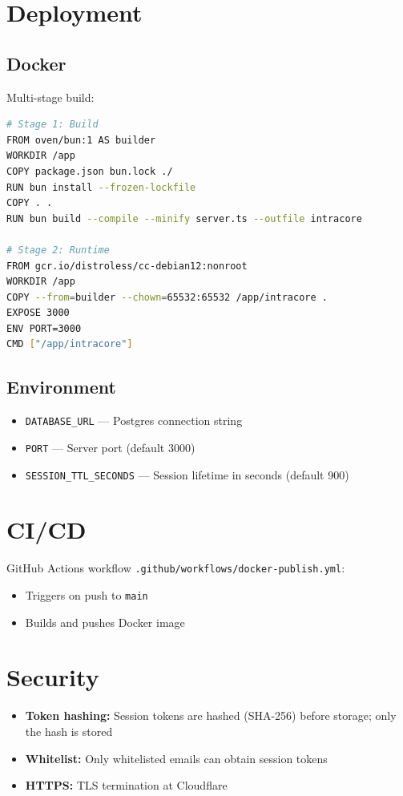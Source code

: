 \documentclass{article}
\begin{document}
\clearpage
\section{Deployment}

\subsection{Docker}
Multi-stage build:

\begin{lstlisting}[language=bash]
# Stage 1: Build
FROM oven/bun:1 AS builder
WORKDIR /app
COPY package.json bun.lock ./
RUN bun install --frozen-lockfile
COPY . .
RUN bun build --compile --minify server.ts --outfile intracore

# Stage 2: Runtime
FROM gcr.io/distroless/cc-debian12:nonroot
WORKDIR /app
COPY --from=builder --chown=65532:65532 /app/intracore .
EXPOSE 3000
ENV PORT=3000
CMD ["/app/intracore"]
\end{lstlisting}

\subsection{Environment}
\begin{itemize}[noitemsep]
  \item \texttt{DATABASE\_URL} --- Postgres connection string
  \item \texttt{PORT} --- Server port (default 3000)
  \item \texttt{SESSION\_TTL\_SECONDS} --- Session lifetime in seconds (default 900)
\end{itemize}

\section{CI/CD}

GitHub Actions workflow \texttt{.github/workflows/docker-publish.yml}:

\begin{itemize}[noitemsep]
  \item Triggers on push to \texttt{main}
  \item Builds and pushes Docker image
\end{itemize}

\section{Security}

\begin{itemize}[noitemsep]
  \item \textbf{Token hashing:} Session tokens are hashed (SHA-256) before storage; only the hash is stored
  \item \textbf{Whitelist:} Only whitelisted emails can obtain session tokens
  \item \textbf{HTTPS:} TLS termination at Cloudflare
\end{itemize}
\end{document}
